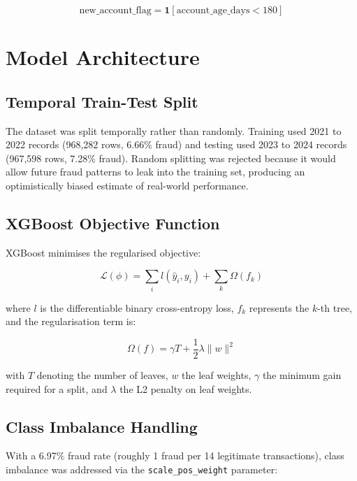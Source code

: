 \documentclass[12pt, a4paper]{article}
\begin{document}
\[
    \text{new\_account\_flag} = \mathbf{1}[\text{account\_age\_days} < 180]
\]

\section{Model Architecture}

\subsection{Temporal Train-Test Split}

The dataset was split temporally rather than randomly. Training used 2021 to 2022 records (968,282 rows, 6.66\% fraud) and testing used 2023 to 2024 records (967,598 rows, 7.28\% fraud). Random splitting was rejected because it would allow future fraud patterns to leak into the training set, producing an optimistically biased estimate of real-world performance.

\subsection{XGBoost Objective Function}

XGBoost minimises the regularised objective:

\begin{equation}
    \mathcal{L}(\phi) = \sum_{i} l(\hat{y}_i, y_i) + \sum_{k} \Omega(f_k)
    \label{eq:xgb_obj}
\end{equation}

where $l$ is the differentiable binary cross-entropy loss, $f_k$ represents the $k$-th tree, and the regularisation term is:

\begin{equation}
    \Omega(f) = \gamma T + \frac{1}{2}\lambda \|w\|^2
    \label{eq:xgb_reg}
\end{equation}

with $T$ denoting the number of leaves, $w$ the leaf weights, $\gamma$ the minimum gain required for a split, and $\lambda$ the L2 penalty on leaf weights.

\subsection{Class Imbalance Handling}

With a 6.97\% fraud rate (roughly 1 fraud per 14 legitimate transactions), class imbalance was addressed via the \texttt{scale\_pos\_weight} parameter:
\end{document}
